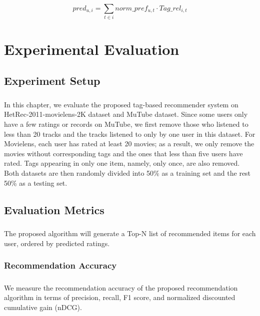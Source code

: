 \documentclass[a4paper,12pt]{report}
\begin{document}
\begin{equation}
    pred_{u,i} = \sum_{t\in i} norm\_pref_{u,t} \cdot Tag\_rel_{i,t}
    \label{eq:pred_rating}
\end{equation}

\chapter{Experimental Evaluation}
\section{Experiment Setup}
\paragraph{}
In this chapter, we evaluate the proposed tag-based recommender system on HetRec-2011-movielens-2K dataset and MuTube dataset. Since some users only have a few ratings or records on MuTube, we first remove those who listened to less than 20 tracks and the tracks listened to only by one user in this dataset. For Movielens, each user has rated at least 20 movies; as a result, we only remove the movies without corresponding tags and the ones that less than five users have rated. Tags appearing in only one item, namely, only once, are also removed. Both datasets are then randomly divided into 50\% as a training set and the rest 50\% as a testing set. 

\section{Evaluation Metrics}
\paragraph{}
The proposed algorithm will generate a Top-N list of recommended items for each user, ordered by predicted ratings. 
\subsection{Recommendation Accuracy}
\paragraph{}
We measure the recommendation accuracy of the proposed recommendation algorithm in terms of precision, recall, F1 score, and normalized discounted cumulative gain (nDCG).
\end{document}
